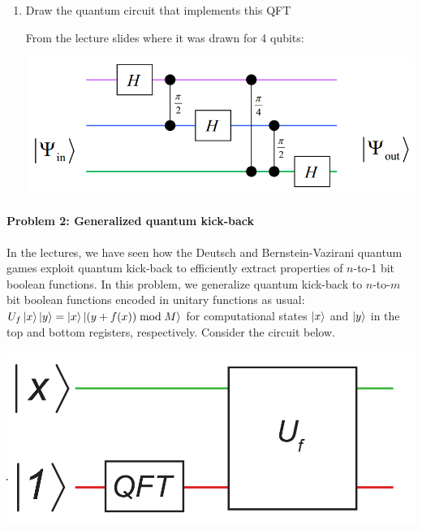 \documentclass[12pt]{article}
\newenvironment{answer}{\begingroup\setlength{\leftskip}{-\leftmargin}\begin{framed}}{\end{framed}\endgroup}
\begin{document}
\begin{enumerate}
    \item Draw the quantum circuit that implements this QFT

    \begin{answer}
        From the lecture slides where it was drawn for 4 qubits:
        \begin{center}\includegraphics[width=.8\textwidth]{problem-1.png}\end{center}
    \end{answer}

\end{enumerate}

\paragraph{Problem 2: Generalized quantum kick-back} \hfill

In the lectures, we have seen how the Deutsch and Bernstein-Vazirani quantum games exploit quantum kick-back to efficiently extract properties of $n$-to-1 bit boolean functions. In this problem, we generalize quantum kick-back to $n$-to-$m$ bit boolean functions encoded in unitary functions as usual: $U_f\ket{x}\ket{y} = \ket{x}\ket{(y + f(x)) \bmod M}$ for computational states $\ket{x}$ and $\ket{y}$ in the top and bottom registers, respectively. Consider the circuit below.

\begin{center}\includegraphics[width=.5\textwidth]{problem-2.png}\end{center}
\end{document}
